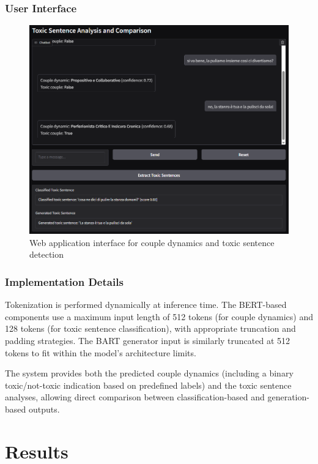\documentclass[conference]{IEEEtran}
\begin{document}
\subsubsection{User Interface}
\noindent

\begin{figure}[H]
  \centering
  \includegraphics[width=\columnwidth]{figures/web_app_interface_used.png}
  \caption{Web application interface for couple dynamics and toxic sentence detection}
  \label{fig:web_app_interface}
\end{figure}

\subsubsection{Implementation Details}
Tokenization is performed dynamically at inference time. The BERT-based components use a maximum input length of 512 tokens (for couple dynamics) and 128 tokens (for toxic sentence classification), with appropriate truncation and padding strategies. The BART generator input is similarly truncated at 512 tokens to fit within the model's architecture limits.

The system provides both the predicted couple dynamics (including a binary toxic/not-toxic indication based on predefined labels) and the toxic sentence analyses, allowing direct comparison between classification-based and generation-based outputs.

\section{Results}
\end{document}

